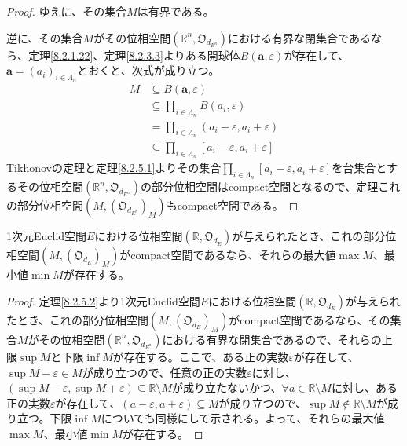\documentclass[dvipdfmx]{jsarticle}
\begin{document}
\begin{proof}
ゆえに、その集合$M$は有界である。\par
逆に、その集合$M$がその位相空間$\left( \mathbb{R}^{n},\mathfrak{O}_{d_{E^{n}}} \right)$における有界な閉集合であるなら、定理\ref{8.2.1.22}、定理\ref{8.2.3.3}よりある開球体$B\left( \mathbf{a},\varepsilon \right)$が存在して、$\mathbf{a} = \left( a_{i} \right)_{i \in \varLambda_{n}}$とおくと、次式が成り立つ。
\begin{align*}
M &\subseteq B\left( \mathbf{a},\varepsilon \right)\\
&\subseteq \prod_{i \in \varLambda_{n}} {B\left( a_{i},\varepsilon \right)}\\
&= \prod_{i \in \varLambda_{n}} \left( a_{i} - \varepsilon,a_{i} + \varepsilon \right)\\
&\subseteq \prod_{i \in \varLambda_{n}} \left[ a_{i} - \varepsilon,a_{i} + \varepsilon \right]
\end{align*}
Tikhonovの定理と定理\ref{8.2.5.1}よりその集合$\prod_{i \in \varLambda_{n}} \left[ a_{i} - \varepsilon,a_{i} + \varepsilon \right]$を台集合とするその位相空間$\left( \mathbb{R}^{n},\mathfrak{O}_{d_{E^{n}}} \right)$の部分位相空間はcompact空間となるので、定理これの部分位相空間$\left( M,\left( \mathfrak{O}_{d_{E^{n}}} \right)_{M} \right)$もcompact空間である。
\end{proof}
\begin{thm}\label{8.2.5.3}
1次元Euclid空間$E$における位相空間$\left( \mathbb{R},\mathfrak{O}_{d_{E}} \right)$が与えられたとき、これの部分位相空間$\left( M,\left( \mathfrak{O}_{d_{E}} \right)_{M} \right)$がcompact空間であるなら、それらの最大値$\max M$、最小値$\min M$が存在する。
\end{thm}
\begin{proof} 定理\ref{8.2.5.2}より1次元Euclid空間$E$における位相空間$\left( \mathbb{R},\mathfrak{O}_{d_{E}} \right)$が与えられたとき、これの部分位相空間$\left( M,\left( \mathfrak{O}_{d_{E}} \right)_{M} \right)$がcompact空間であるなら、その集合$M$がその位相空間$\left( \mathbb{R}^{n},\mathfrak{O}_{d_{E^{n}}} \right)$における有界な閉集合であるので、それらの上限$\sup M$と下限$\inf M$が存在する。ここで、ある正の実数$\varepsilon$が存在して、$\sup M - \varepsilon \in M$が成り立つので、任意の正の実数$\varepsilon$に対し、$\left( \sup M - \varepsilon,\sup M + \varepsilon \right) \subseteq \mathbb{R} \setminus M$が成り立たないかつ、$\forall a \in \mathbb{R} \setminus M$に対し、ある正の実数$\varepsilon$が存在して、$(a - \varepsilon,a + \varepsilon) \subseteq M$が成り立つので、$\sup M \notin \mathbb{R} \setminus M$が成り立つ。下限$\inf M$についても同様にして示される。よって、それらの最大値$\max M$、最小値$\min M$が存在する。
\end{proof}
\end{document}
